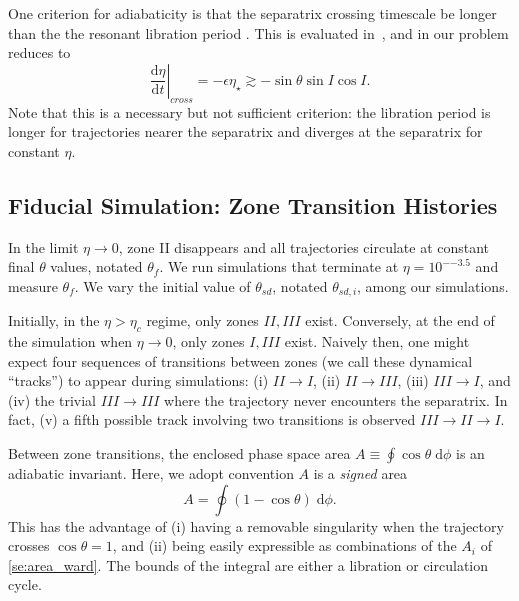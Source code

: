 \documentclass[
        fleqn,
        usenatbib,
    ]{mnras}
\newcommand*{\rd}[2]{\frac{\mathrm{d}#1}{\mathrm{d}#2}}
\newcommand*{\at}[1]{\left.#1\right|}
\newcommand*{\p}[1]{\left(#1\right)}
\begin{document}
One criterion for adiabaticity is that the separatrix crossing timescale be
longer than the the resonant libration period \citep{ward2004I}. This is
evaluated in~\cite{millholland_disk}, and in our problem reduces to
\begin{equation}
    \at{\rd{\eta}{t}}_{cross} = -\epsilon\eta_\star \gtrsim
        -\sin\theta \sin I \cos I.\label{eq:ad_constr}
\end{equation}
Note that this is a necessary but not sufficient criterion: the libration period
is longer for trajectories nearer the separatrix and diverges at the separatrix
for constant $\eta$.

\subsection{Fiducial Simulation: Zone Transition Histories}\label{ss:ad_fid}

In the limit $\eta \to 0$, zone II disappears and all trajectories circulate at
constant final $\theta$ values, notated $\theta_f$. We run simulations that
terminate at $\eta = 10^{-{-3.5}}$ and measure $\theta_{f}$. We vary the initial
value of $\theta_{sd}$, notated $\theta_{sd, i}$, among our simulations.

Initially, in the $\eta > \eta_c$ regime, only zones $II, III$ exist.
Conversely, at the end of the simulation when $\eta \to 0$, only zones $I, III$
exist. Naively then, one might expect four sequences of transitions
between zones (we call these dynamical ``tracks'') to appear during simulations:
(i) $II \to I$, (ii) $II \to III$, (iii) $III \to I$, and (iv) the trivial $III
\to III$ where the trajectory never encounters the separatrix. In fact, (v) a
fifth possible track involving two transitions is observed $III \to II \to I$.

Between zone transitions, the enclosed phase space area $A \equiv \oint \cos\theta
\;\mathrm{d}\phi$ is an adiabatic invariant. Here, we adopt convention $A$ is a
\emph{signed} area
\begin{equation}
    A = \oint \p{1 - \cos \theta}\;\mathrm{d}\phi.
\end{equation}
This has the advantage of (i) having a removable singularity when the trajectory
crosses $\cos \theta = 1$, and (ii) being easily expressible as combinations of
the $A_i$ of \autoref{se:area_ward}. The bounds of the integral are either a
libration or circulation cycle.
\end{document}
